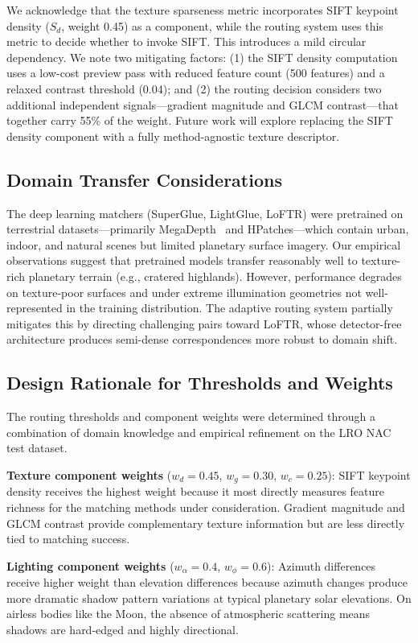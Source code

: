 \documentclass[lettersize,journal]{IEEEtran}
\begin{document}
We acknowledge that the texture sparseness metric incorporates SIFT keypoint density ($S_d$, weight 0.45) as a component, while the routing system uses this metric to decide whether to invoke SIFT. This introduces a mild circular dependency. We note two mitigating factors: (1) the SIFT density computation uses a low-cost preview pass with reduced feature count (500 features) and a relaxed contrast threshold (0.04); and (2) the routing decision considers two additional independent signals---gradient magnitude and GLCM contrast---that together carry 55\% of the weight. Future work will explore replacing the SIFT density component with a fully method-agnostic texture descriptor.

\subsection{Domain Transfer Considerations}

The deep learning matchers (SuperGlue, LightGlue, LoFTR) were pretrained on terrestrial datasets---primarily MegaDepth~\cite{li2018megadepth} and HPatches---which contain urban, indoor, and natural scenes but limited planetary surface imagery. Our empirical observations suggest that pretrained models transfer reasonably well to texture-rich planetary terrain (e.g., cratered highlands). However, performance degrades on texture-poor surfaces and under extreme illumination geometries not well-represented in the training distribution. The adaptive routing system partially mitigates this by directing challenging pairs toward LoFTR, whose detector-free architecture produces semi-dense correspondences more robust to domain shift.

\subsection{Design Rationale for Thresholds and Weights}

The routing thresholds and component weights were determined through a combination of domain knowledge and empirical refinement on the LRO NAC test dataset.

\textbf{Texture component weights} ($w_d = 0.45$, $w_g = 0.30$, $w_c = 0.25$): SIFT keypoint density receives the highest weight because it most directly measures feature richness for the matching methods under consideration. Gradient magnitude and GLCM contrast provide complementary texture information but are less directly tied to matching success.

\textbf{Lighting component weights} ($w_\alpha = 0.4$, $w_\phi = 0.6$): Azimuth differences receive higher weight than elevation differences because azimuth changes produce more dramatic shadow pattern variations at typical planetary solar elevations. On airless bodies like the Moon, the absence of atmospheric scattering means shadows are hard-edged and highly directional.
\end{document}
